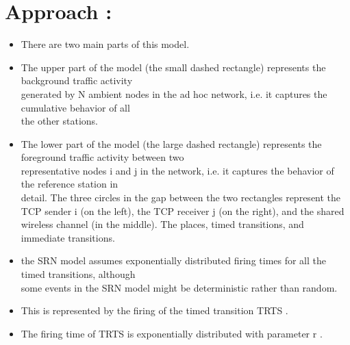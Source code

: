 \documentclass[a4paper,12pt]{article}
\begin{document}
\section{Approach :}
\begin{itemize}
\item There are two main parts of this model.
\item The upper part of the model (the small dashed rectangle) represents the background traffic activity  \\ 
      generated by N ambient nodes in the ad hoc network, i.e. it captures the cumulative behavior of all \\
      the other stations. 
\item The lower part of the model (the large dashed rectangle) represents the foreground traffic activity between two \\
      representative nodes i and j in the network, i.e. it captures the behavior of the reference station
      in \\ detail. The three circles in the gap between the two rectangles represent the TCP sender i (on
      the left), the TCP receiver j (on the right), and the shared wireless channel (in the middle). The
      places, timed transitions, and immediate transitions.
\item the SRN model assumes exponentially distributed firing times for all the timed transitions, although \\
      some events in the SRN model might be deterministic rather than random.
\item This is represented by the firing of the timed transition TRTS .
\item The firing time of TRTS is exponentially distributed with parameter r .
\end{itemize}
\newpage
\end{document}
